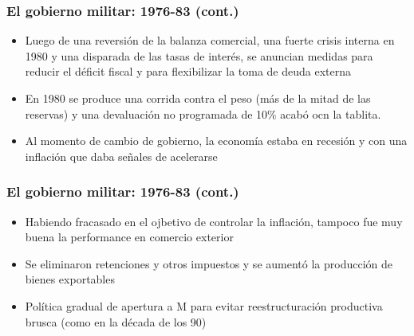 \documentclass[14pt,aspectratio=169]{beamer}
\begin{document}
 \begin{frame}\frametitle{El gobierno militar: 1976-83 (cont.)}
                 \begin{itemize}\itemsep 5pt \medskip
                 \item Luego de una reversión de la balanza comercial,
                   una fuerte crisis interna en 1980 y una disparada
                   de las tasas de interés, se anuncian medidas para
                   reducir el déficit fiscal y para flexibilizar la
                   toma de deuda externa
                   \item En 1980 se produce una corrida contra el peso
                     (más de la mitad de las reservas)
                     y una devaluación no programada de 10\% acabó ocn
                     la tablita.
                     \item Al momento de cambio de gobierno, la
                       economía estaba en recesión y con una inflación
                       que daba señales de acelerarse
                   \end{itemize} 
               \end{frame}
               




 \begin{frame}\frametitle{El gobierno militar: 1976-83 (cont.)}
                 \begin{itemize}\itemsep 5pt \medskip
                 \item Habiendo fracasado en el ojbetivo de controlar
                   la inflación, tampoco fue muy buena la performance
                   en comercio exterior
                   \item Se eliminaron retenciones y otros impuestos y
                     se aumentó la producción de bienes exportables
                     \item Política gradual de apertura a M para
                       evitar reestructuración productiva brusca (como
                       en la década de los 90)
                   \end{itemize} 
               \end{frame}
               
\end{document}
